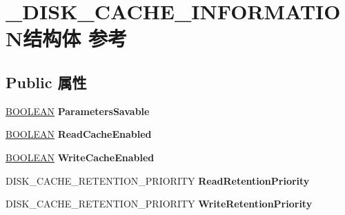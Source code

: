 \hypertarget{struct___d_i_s_k___c_a_c_h_e___i_n_f_o_r_m_a_t_i_o_n}{}\section{\+\_\+\+D\+I\+S\+K\+\_\+\+C\+A\+C\+H\+E\+\_\+\+I\+N\+F\+O\+R\+M\+A\+T\+I\+O\+N结构体 参考}
\label{struct___d_i_s_k___c_a_c_h_e___i_n_f_o_r_m_a_t_i_o_n}
\subsection*{Public 属性}
\begin{DoxyCompactItemize}
\item 
\mbox{\label{struct___d_i_s_k___c_a_c_h_e___i_n_f_o_r_m_a_t_i_o_n_a92e80dae1e00b74593a376bc83d92d08}} 
\hyperlink{_processor_bind_8h_a112e3146cb38b6ee95e64d85842e380a}{B\+O\+O\+L\+E\+AN} {\bfseries Parameters\+Savable}
\item 
\mbox{\label{struct___d_i_s_k___c_a_c_h_e___i_n_f_o_r_m_a_t_i_o_n_affc78ff4783965b35e1fe7e857af15d3}} 
\hyperlink{_processor_bind_8h_a112e3146cb38b6ee95e64d85842e380a}{B\+O\+O\+L\+E\+AN} {\bfseries Read\+Cache\+Enabled}
\item 
\mbox{\label{struct___d_i_s_k___c_a_c_h_e___i_n_f_o_r_m_a_t_i_o_n_ad54f4af248a321490fb85468228765a7}} 
\hyperlink{_processor_bind_8h_a112e3146cb38b6ee95e64d85842e380a}{B\+O\+O\+L\+E\+AN} {\bfseries Write\+Cache\+Enabled}
\item 
\mbox{\label{struct___d_i_s_k___c_a_c_h_e___i_n_f_o_r_m_a_t_i_o_n_a8250f2750edd6a284895227b2f274685}} 
D\+I\+S\+K\+\_\+\+C\+A\+C\+H\+E\+\_\+\+R\+E\+T\+E\+N\+T\+I\+O\+N\+\_\+\+P\+R\+I\+O\+R\+I\+TY {\bfseries Read\+Retention\+Priority}
\item 
\mbox{\label{struct___d_i_s_k___c_a_c_h_e___i_n_f_o_r_m_a_t_i_o_n_af0d86d111ee29550214b3b99ccf5a083}} 
D\+I\+S\+K\+\_\+\+C\+A\+C\+H\+E\+\_\+\+R\+E\+T\+E\+N\+T\+I\+O\+N\+\_\+\+P\+R\+I\+O\+R\+I\+TY {\bfseries Write\+Retention\+Priority}

\end{DoxyCompactItemize}
